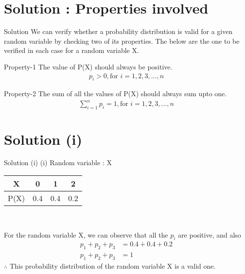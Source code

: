 \documentclass{beamer}
\begin{document}
\section{Solution : Properties involved}
\begin{frame}{Solution}
We can verify whether a probability distribution is valid for a given random variable by checking two of its properties. The below are the one to be verified in each case for a random variable X.\\
\begin{block}{Property-1}
        The value of P(X) should always be positive.
\begin{align*}
p_i>0, \text{for $i = {1,2,3,...,n}$}
\end{align*}
    \end{block}
    \begin{block}{Property-2}
       The sum of all the values of P(X) should always sum upto one.
\begin{align*}
\sum^{n}_{i = 1}p_i = 1, \text{for $i = {1,2,3,...,n}$}
\end{align*}
    \end{block}
\end{frame} 
\section{Solution (i)}
\begin{frame}{Solution (i)}
(i) Random variable : X
\begin{table}
\centering

\begin{tabular}{|c|c|c|c|}
\hline
    X & 0 & 1 & 2 \\ 
\hline
    P(X) & 0.4 & 0.4 & 0.2\\ 
\hline
\end{tabular}\\
\end{table}
\par For the random variable X, we can observe that all the $p_i$ are positive, and also
    \begin{align}
    p_1 + p_2 + p_3 &= 0.4 + 0.4 + 0.2\\ 
   p_1 + p_2 + p_3 &= 1
    \end{align}
    $\therefore$ This probability distribution of the random variable X is a valid one.
\end{frame} 
\end{document}
